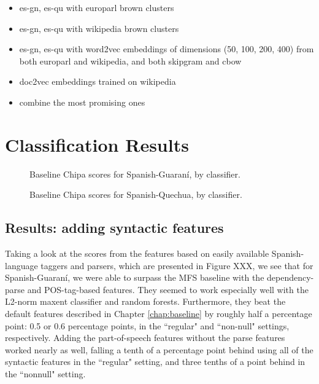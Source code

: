 \begin{itemize}
  \item es-gn, es-qu with europarl brown clusters
  \item es-gn, es-qu with wikipedia brown clusters
\end{itemize}

\begin{itemize}
  \item es-gn, es-qu with word2vec embeddings of dimensions (50, 100, 200, 400)
  from both europarl and wikipedia, and both skipgram and cbow
  \item doc2vec embeddings trained on wikipedia
\end{itemize}

\begin{itemize}
  \item combine the most promising ones
\end{itemize}

\section{Classification Results} 

\begin{figure}
  \caption{Baseline Chipa scores for Spanish-Guaraní, by classifier.}
  \label{fig:esgnresults:monolingual}
\end{figure}

\begin{figure}
  \caption{Baseline Chipa scores for Spanish-Quechua, by classifier.}
  \label{fig:esquresults:monolingual}
\end{figure}

\subsection{Results: adding syntactic features}
Taking a look at the scores from the features based on easily available
Spanish-language taggers and parsers, which are presented in Figure XXX, we see
that for Spanish-Guaraní, we were able to surpass the MFS baseline with the
dependency-parse and POS-tag-based features. They seemed to work especially
well with the L2-norm maxent classifier and random forests. Furthermore, they
beat the default features described in Chapter \ref{chap:baseline} by roughly
half a percentage point: 0.5 or 0.6 percentage points, in the ``regular" and
``non-null" settings, respectively. Adding the part-of-speech features without
the parse features worked nearly as well, falling a tenth of a percentage point
behind using all of the syntactic features in the ``regular" setting, and three
tenths of a point behind in the ``nonnull" setting.

